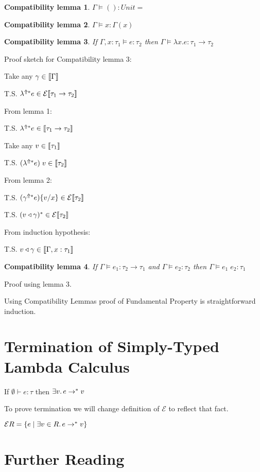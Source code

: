 \newtheorem{compatlemma}{Compatibility lemma}

\begin{compatlemma}
  $\Gamma \models () : Unit =$
\end{compatlemma}

\begin{compatlemma}
  $\Gamma \models x : \Gamma(x)$
\end{compatlemma}

\begin{compatlemma}
  If $\Gamma, x:\tau_1 \models e : \tau_2$ then $\Gamma \models \lambda x.e : \tau_1 \to \tau_2$
\end{compatlemma}

Proof sketch for Compatibility lemma 3:

Take any $\gamma \in \llbracket\Gamma\rrbracket$

T.S. $\lambda^{\Uparrow*} e \in \mathcal{E}\llbracket\tau_1 \to \tau_2\rrbracket$

From lemma 1:

T.S. $\lambda^{\Uparrow*} e \in \llbracket\tau_1 \to \tau_2\rrbracket$

Take any $v \in \llbracket\tau_1\rrbracket$

T.S. $(\lambda^{\Uparrow*} e)\;v \in \llbracket\tau_2\rrbracket$

From lemma 2:

T.S. $(\gamma^{\Uparrow*} e)\{v/x\} \in \mathcal{E}\llbracket\tau_2\rrbracket$

T.S. $(v \triangleleft \gamma)^* \in \mathcal{E}\llbracket\tau_2\rrbracket$

From induction hypothesis:

T.S. $v \triangleleft \gamma \in \llbracket\Gamma, x : \tau_1\rrbracket$

\begin{compatlemma}
  If $\Gamma \models e_1 : \tau_2 \to \tau_1 $ and $\Gamma \models e_2 : \tau_2$ then $\Gamma \models e_1\;e_2 : \tau_1$
\end{compatlemma}
Proof using lemma 3.

\medskip

Using Compatibility Lemmas proof of Fundamental Property is straightforward induction.

\section{Termination of Simply-Typed Lambda Calculus}

If $\emptyset \vdash e : \tau$ then $\exists v\ldotp e \to^* v$

To prove termination we will change definition of $\mathcal{E}$ to reflect that fact.

$\mathcal{E}R = \{ e \mid \exists v \in R\ldotp e \to^* v \}$

\section{Further Reading}
